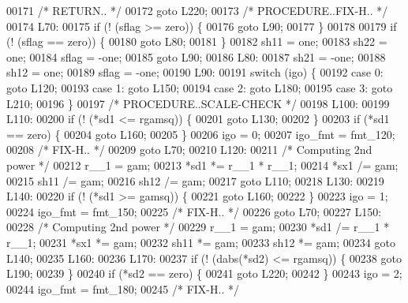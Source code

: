 \begin{DoxyCode}
00171 \textcolor{comment}{/*         RETURN.. */}
00172     \textcolor{keywordflow}{goto} L220;
00173 \textcolor{comment}{/*     PROCEDURE..FIX-H.. */}
00174 L70:
00175     \textcolor{keywordflow}{if} (! (sflag >= zero)) \{
00176     \textcolor{keywordflow}{goto} L90;
00177     \}
00178 
00179     \textcolor{keywordflow}{if} (! (sflag == zero)) \{
00180     \textcolor{keywordflow}{goto} L80;
00181     \}
00182     sh11 = one;
00183     sh22 = one;
00184     sflag = -one;
00185     \textcolor{keywordflow}{goto} L90;
00186 L80:
00187     sh21 = -one;
00188     sh12 = one;
00189     sflag = -one;
00190 L90:
00191     \textcolor{keywordflow}{switch} (igo) \{
00192     \textcolor{keywordflow}{case} 0: \textcolor{keywordflow}{goto} L120;
00193     \textcolor{keywordflow}{case} 1: \textcolor{keywordflow}{goto} L150;
00194     \textcolor{keywordflow}{case} 2: \textcolor{keywordflow}{goto} L180;
00195     \textcolor{keywordflow}{case} 3: \textcolor{keywordflow}{goto} L210;
00196     \}
00197 \textcolor{comment}{/*     PROCEDURE..SCALE-CHECK */}
00198 L100:
00199 L110:
00200     \textcolor{keywordflow}{if} (! (*sd1 <= rgamsq)) \{
00201     \textcolor{keywordflow}{goto} L130;
00202     \}
00203     \textcolor{keywordflow}{if} (*sd1 == zero) \{
00204     \textcolor{keywordflow}{goto} L160;
00205     \}
00206     igo = 0;
00207     igo\_fmt = fmt\_120;
00208 \textcolor{comment}{/*              FIX-H.. */}
00209     \textcolor{keywordflow}{goto} L70;
00210 L120:
00211 \textcolor{comment}{/* Computing 2nd power */}
00212     r\_\_1 = gam;
00213     *sd1 *= r\_\_1 * r\_\_1;
00214     *sx1 /= gam;
00215     sh11 /= gam;
00216     sh12 /= gam;
00217     \textcolor{keywordflow}{goto} L110;
00218 L130:
00219 L140:
00220     \textcolor{keywordflow}{if} (! (*sd1 >= gamsq)) \{
00221     \textcolor{keywordflow}{goto} L160;
00222     \}
00223     igo = 1;
00224     igo\_fmt = fmt\_150;
00225 \textcolor{comment}{/*              FIX-H.. */}
00226     \textcolor{keywordflow}{goto} L70;
00227 L150:
00228 \textcolor{comment}{/* Computing 2nd power */}
00229     r\_\_1 = gam;
00230     *sd1 /= r\_\_1 * r\_\_1;
00231     *sx1 *= gam;
00232     sh11 *= gam;
00233     sh12 *= gam;
00234     \textcolor{keywordflow}{goto} L140;
00235 L160:
00236 L170:
00237     \textcolor{keywordflow}{if} (! (dabs(*sd2) <= rgamsq)) \{
00238     \textcolor{keywordflow}{goto} L190;
00239     \}
00240     \textcolor{keywordflow}{if} (*sd2 == zero) \{
00241     \textcolor{keywordflow}{goto} L220;
00242     \}
00243     igo = 2;
00244     igo\_fmt = fmt\_180;
00245 \textcolor{comment}{/*              FIX-H.. */}

\end{DoxyCode}
